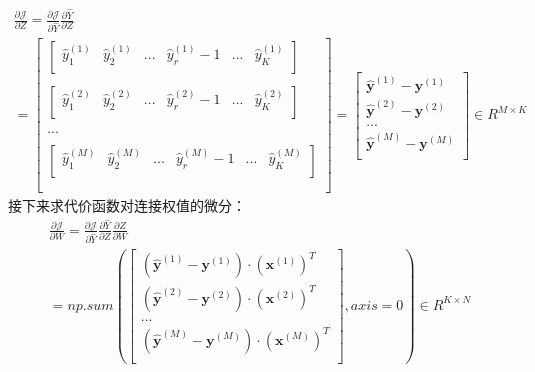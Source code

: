 \documentclass[UTF8]{article}
\begin{document}
\begin{equation}
\begin{aligned}
\frac{\partial{\mathcal{J}}}{\partial{Z}}=\frac{\partial{\mathcal{J}}}{\partial{\hat{Y}}} \frac{\partial{\hat{Y}}}{\partial{Z}} \\
 =\begin{bmatrix}
\begin{bmatrix}
\hat{y}_{1}^{(1)} & \hat{y}_{2}^{(1)} & ... & \hat{y}_{r}^{(1)}-1 & ... & \hat{y}_{K}^{(1)} \\
 \end{bmatrix} \\ \\
\begin{bmatrix}
\hat{y}_{1}^{(2)} & \hat{y}_{2}^{(2)} & ... & \hat{y}_{r}^{(2)}-1 & ... & \hat{y}_{K}^{(2)} \\
 \end{bmatrix} \\ \\
 ... \\ \\
 \begin{bmatrix}
\hat{y}_{1}^{(M)} & \hat{y}_{2}^{(M)} & ... & \hat{y}_{r}^{(M)}-1 & ... & \hat{y}_{K}^{(M)} \\
 \end{bmatrix} \\ \\
\end{bmatrix}
=\begin{bmatrix}
\hat{\boldsymbol{y}}^{(1)}-\boldsymbol{y}^{(1)} \\
\hat{\boldsymbol{y}}^{(2)}-\boldsymbol{y}^{(2)} \\
... \\
\hat{\boldsymbol{y}}^{(M)}-\boldsymbol{y}^{(M)} \\
\end{bmatrix} \in R^{M \times K}
\end{aligned}
\label{mlp-pJ-pZ-def}
\end{equation}
接下来求代价函数对连接权值的微分：
\begin{equation}
\begin{aligned}
\frac{\partial{\mathcal{J}}}{\partial{W}}=\frac{\partial{\mathcal{J}}}{\partial{\hat{Y}}} \frac{\partial{\hat{Y}}}{\partial{Z}} \frac{\partial{Z}}{\partial{W}} \\
 =np.sum(\begin{bmatrix}
(\hat{\boldsymbol{y}}^{(1)}-\boldsymbol{y}^{(1)}) \cdot (\boldsymbol{x}^{(1)})^{T} \\
(\hat{\boldsymbol{y}}^{(2)}-\boldsymbol{y}^{(2)}) \cdot (\boldsymbol{x}^{(2)})^{T} \\
... \\
(\hat{\boldsymbol{y}}^{(M)}-\boldsymbol{y}^{(M)}) \cdot (\boldsymbol{x}^{(M)})^{T} \\
\end{bmatrix}, axis=0) \in R^{K \times N}
\end{aligned}
\label{mlp-pJ-pW-def}
\end{equation}
\end{document}
